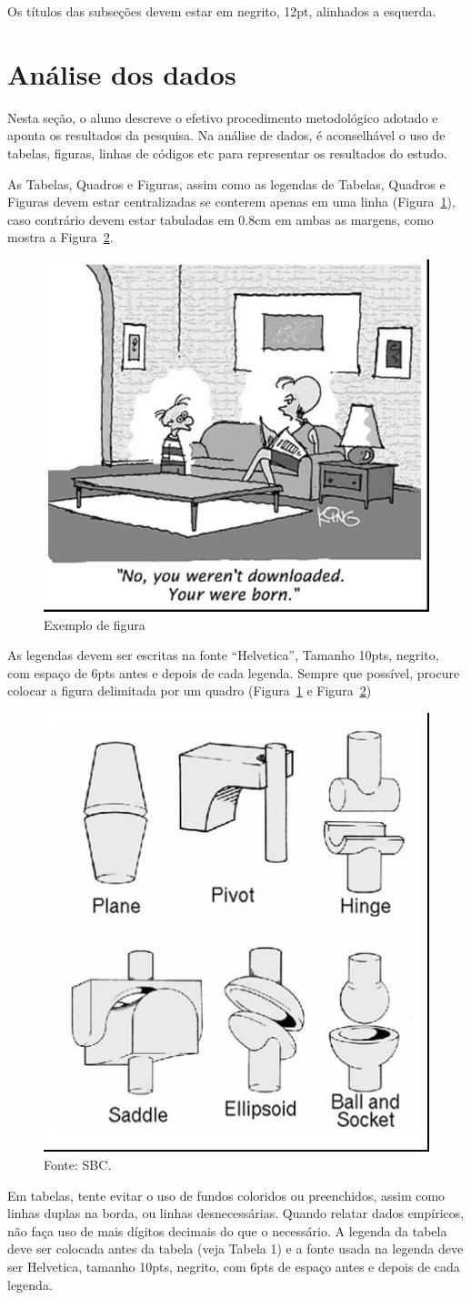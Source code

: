 \documentclass[12pt]{article}
\begin{document}
Os títulos das subseções devem estar em negrito, 12pt, alinhados a esquerda.


\section{Análise dos dados}\label{sec:analisedosdados}

Nesta seção, o aluno descreve o efetivo procedimento metodológico adotado e aponta os resultados da pesquisa. Na análise de dados, é  aconselhável o uso de tabelas, figuras, linhas de códigos etc para representar os resultados do estudo.

As Tabelas, Quadros e Figuras, assim como as legendas de Tabelas, Quadros e Figuras devem estar centralizadas se conterem apenas em uma linha (Figura~\ref{fig:figura1}), caso contrário devem estar tabuladas em 0.8cm em ambas as margens, como mostra a Figura~\ref{fig:figura2}. 

\begin{figure}[ht]
\centering
\includegraphics[width=.3\textwidth]{fig1.jpg}
\caption{Exemplo de figura}
\label{fig:figura1}
\end{figure}

As legendas devem ser escritas na fonte “Helvetica”, Tamanho 10pts, negrito, com espaço de 6pts antes e depois de cada legenda. Sempre que possível, procure colocar a figura delimitada por um quadro (Figura~\ref{fig:figura1} e Figura~\ref{fig:figura2})

\begin{figure}[!ht]
\centering
\includegraphics[width=.2\textwidth]{fig2.jpg}
\caption{Essa figura foi referenciada na Seção~\ref{sec:analisedosdados}.}
\caption{Fonte: SBC.}
\label{fig:figura2}
\end{figure}

Em tabelas, tente evitar o uso de fundos coloridos ou preenchidos, assim como linhas duplas na borda, ou linhas desnecessárias. Quando \cite{knuth:84} relatar dados empíricos, não faça uso de mais dígitos decimais do que o necessário. A legenda da tabela deve ser colocada antes da tabela (veja Tabela 1) e a fonte usada na legenda deve ser Helvetica, tamanho 10pts, negrito, com 6pts de espaço antes e depois de cada legenda.
\end{document}
